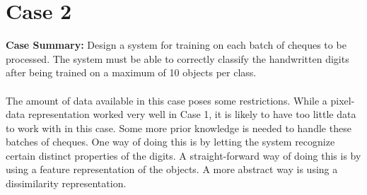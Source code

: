\newpage
\section{Case 2}
\label{sec:Case2}
\textbf{Case Summary:} Design a system for training on each batch of cheques to be processed. The system must be able to correctly classify the handwritten digits after being trained on a maximum of 10 objects per class.\\
\\
\noindent The amount of data available in this case poses some restrictions. While a pixel-data representation worked very well in Case 1, it is likely to have too little data to work with in this case. Some more prior knowledge is needed to handle these batches of cheques. One way of doing this is by letting the system recognize certain distinct properties of the digits. A straight-forward way of doing this is by using a feature representation of the objects. A more abstract way is using a dissimilarity representation.
\\
